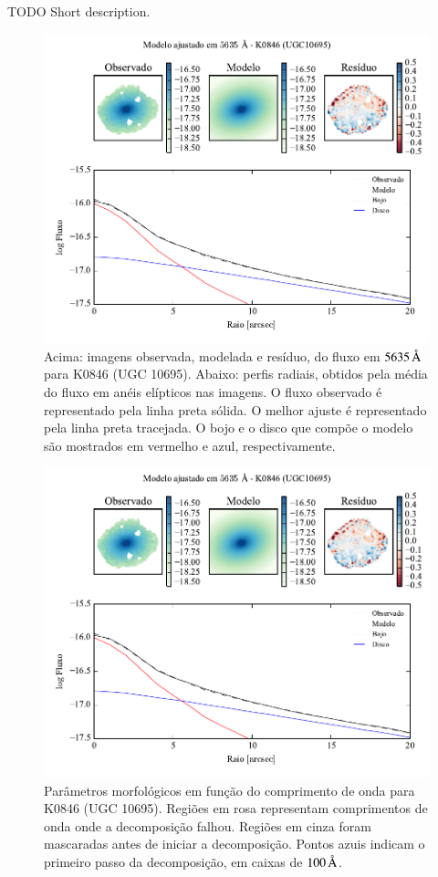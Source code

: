 TODO Short description.

\begin{figure}
	\includegraphics[page=1]{figuras-decomp/K0846_sample006a}
	\caption[Ajuste morfológico em $5635\,\angstrom$ de K0846 (UGC 10695)]
	{Acima: imagens observada, modelada e resíduo, do fluxo em $5635\,\angstrom$
	para K0846 (UGC 10695). Abaixo: perfis radiais, obtidos pela média do fluxo em
	anéis elípticos nas imagens. O fluxo observado é representado pela linha preta
	sólida. O melhor ajuste é representado pela linha preta tracejada. O bojo e o
	disco que compõe o modelo são mostrados em vermelho e azul, respectivamente.}
	\label{fig:decompRadprof:K0846}
\end{figure}

\begin{figure}
	\includegraphics[page=2]{figuras-decomp/K0846_sample006a}
	\caption[Parâmetros morfológicos em função do comprimento de onda de K0846
	(UGC 10695)]
	{Parâmetros morfológicos em função do comprimento de onda para
	K0846 (UGC 10695). Regiões em rosa representam comprimentos de onda onde a
	decomposição falhou. Regiões em cinza foram mascaradas antes de iniciar a
	decomposição. Pontos azuis indicam o primeiro passo da decomposição, em caixas
	de $100\,\text{\normalfont\AA}$.}
	\label{fig:decompParams:K0846}
\end{figure}

